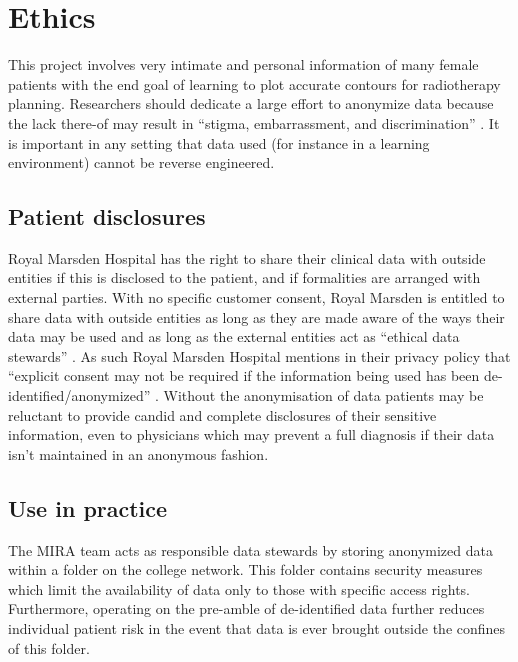 \documentclass[11pt,twoside]{report}
\begin{document}
\chapter{Ethics}\label{sect:ethics}

This project involves very intimate and personal information of many female patients with the end goal of learning to plot accurate contours for radiotherapy planning. Researchers should dedicate a large effort to anonymize data because the lack there-of may result in ``stigma, embarrassment, and discrimination'' \cite{health-privacy}. It is important in any setting that data used (for instance in a learning environment) cannot be reverse engineered.

\section{Patient disclosures}\label{sect:patient-disclosures}

Royal Marsden Hospital has the right to share their clinical data with outside entities if this is disclosed to the patient, and if formalities are arranged with external parties. With no specific customer consent, Royal Marsden is entitled to share data with outside entities as long as they are made aware of the ways their data may be used and as long as the external entities act as ``ethical data stewards'' \cite{ethics-imaging-AI}. As such Royal Marsden Hospital mentions in their privacy policy that ``explicit consent may not be required if the information being used has been de-identified/anonymized'' \cite{royal-marsden-privacy-note}. Without the anonymisation of data patients may be reluctant to provide candid and complete disclosures of their sensitive information, even to physicians which may prevent a full diagnosis if their data isn't maintained in an anonymous fashion.

\section{Use in practice}\label{sect:use-in-practice}

The MIRA team acts as responsible data stewards by storing anonymized data within a folder on the college network. This folder contains security measures which limit the availability of data only to those with specific access rights. Furthermore, operating on the pre-amble of de-identified data further reduces individual patient risk in the event that data is ever brought outside the confines of this folder.
\end{document}
